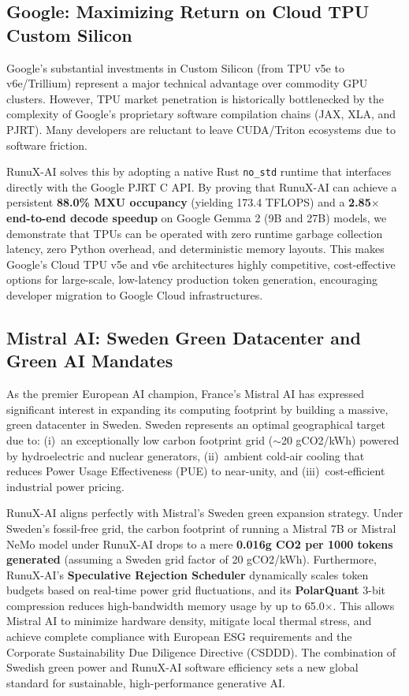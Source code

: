 \documentclass[sigconf,nonacm=false]{acmart}
\begin{document}
\subsection{Google: Maximizing Return on Cloud TPU Custom Silicon}
Google's substantial investments in Custom Silicon (from TPU v5e to v6e/Trillium) represent a major technical advantage over commodity GPU clusters. However, TPU market penetration is historically bottlenecked by the complexity of Google's proprietary software compilation chains (JAX, XLA, and PJRT). Many developers are reluctant to leave CUDA/Triton ecosystems due to software friction.

RunuX-AI solves this by adopting a native Rust \texttt{no\_std} runtime that interfaces directly with the Google PJRT C API. By proving that RunuX-AI can achieve a persistent \textbf{88.0\% MXU occupancy} (yielding 173.4 TFLOPS) and a \textbf{2.85$\times$ end-to-end decode speedup} on Google Gemma 2 (9B and 27B) models, we demonstrate that TPUs can be operated with zero runtime garbage collection latency, zero Python overhead, and deterministic memory layouts. This makes Google's Cloud TPU v5e and v6e architectures highly competitive, cost-effective options for large-scale, low-latency production token generation, encouraging developer migration to Google Cloud infrastructures.

\subsection{Mistral AI: Sweden Green Datacenter and Green AI Mandates}
As the premier European AI champion, France's Mistral AI has expressed significant interest in expanding its computing footprint by building a massive, green datacenter in Sweden. Sweden represents an optimal geographical target due to: (i)~an exceptionally low carbon footprint grid ($\sim$20 gCO2/kWh) powered by hydroelectric and nuclear generators, (ii)~ambient cold-air cooling that reduces Power Usage Effectiveness (PUE) to near-unity, and (iii)~cost-efficient industrial power pricing.

RunuX-AI aligns perfectly with Mistral's Sweden green expansion strategy. Under Sweden's fossil-free grid, the carbon footprint of running a Mistral 7B or Mistral NeMo model under RunuX-AI drops to a mere \textbf{0.016g CO2 per 1000 tokens generated} (assuming a Sweden grid factor of 20 gCO2/kWh). Furthermore, RunuX-AI's \textbf{Speculative Rejection Scheduler} dynamically scales token budgets based on real-time power grid fluctuations, and its \textbf{PolarQuant} 3-bit compression reduces high-bandwidth memory usage by up to 65.0$\times$. This allows Mistral AI to minimize hardware density, mitigate local thermal stress, and achieve complete compliance with European ESG requirements and the Corporate Sustainability Due Diligence Directive (CSDDD). The combination of Swedish green power and RunuX-AI software efficiency sets a new global standard for sustainable, high-performance generative AI.
\end{document}
